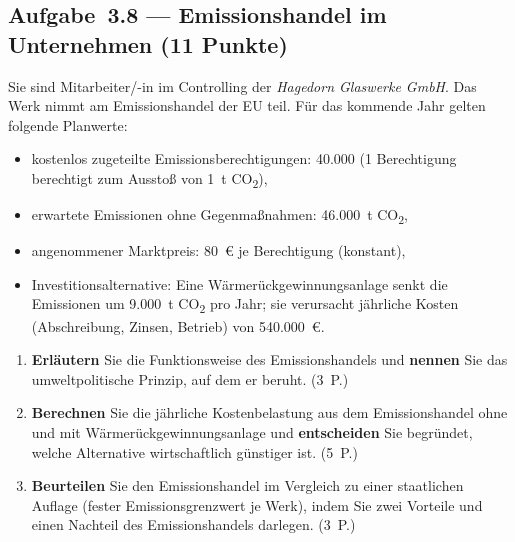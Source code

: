\subsection*{Aufgabe~3.8 --- Emissionshandel im Unternehmen (11 Punkte)}

Sie sind Mitarbeiter/-in im Controlling der \emph{Hagedorn Glaswerke GmbH}. Das Werk
nimmt am Emissionshandel der EU teil. Für das kommende Jahr gelten folgende Planwerte:

\begin{itemize}
  \item kostenlos zugeteilte Emissionsberechtigungen: 40.000 (1 Berechtigung berechtigt
    zum Ausstoß von 1~t CO\textsubscript{2}),
  \item erwartete Emissionen ohne Gegenmaßnahmen: 46.000~t CO\textsubscript{2},
  \item angenommener Marktpreis: 80~€ je Berechtigung (konstant),
  \item Investitionsalternative: Eine Wärmerückgewinnungsanlage senkt die Emissionen um
    9.000~t CO\textsubscript{2} pro Jahr; sie verursacht jährliche Kosten (Abschreibung,
    Zinsen, Betrieb) von 540.000~€.
\end{itemize}

\begin{enumerate}[label=\alph*)]
  \item \textbf{Erläutern} Sie die Funktionsweise des Emissionshandels und \textbf{nennen}
    Sie das umweltpolitische Prinzip, auf dem er beruht. \hfill (3~P.)
  \item \textbf{Berechnen} Sie die jährliche Kostenbelastung aus dem Emissionshandel ohne
    und mit Wärmerückgewinnungsanlage und \textbf{entscheiden} Sie begründet, welche
    Alternative wirtschaftlich günstiger ist. \hfill (5~P.)
  \item \textbf{Beurteilen} Sie den Emissionshandel im Vergleich zu einer staatlichen
    Auflage (fester Emissionsgrenzwert je Werk), indem Sie zwei Vorteile und einen
    Nachteil des Emissionshandels darlegen. \hfill (3~P.)
\end{enumerate}
